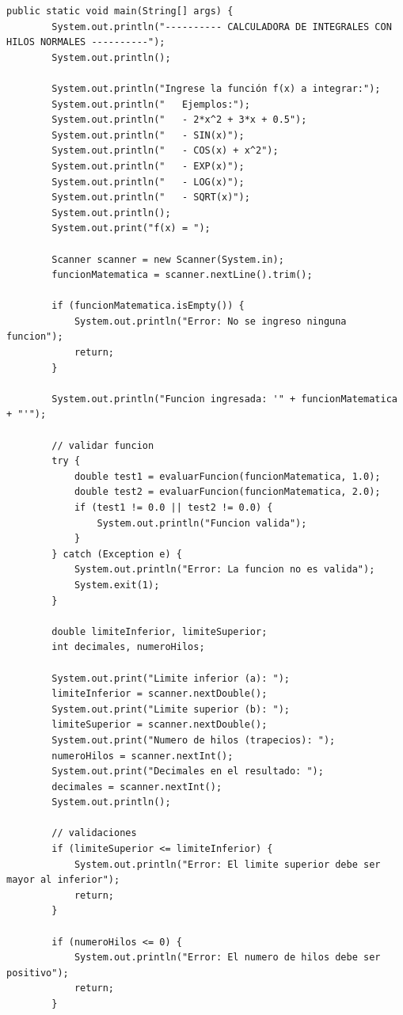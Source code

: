 \begin{lstlisting}[style=java-custom, caption={Función Main en Java}]
    public static void main(String[] args) {
        System.out.println("---------- CALCULADORA DE INTEGRALES CON HILOS NORMALES ----------");
        System.out.println();

        System.out.println("Ingrese la función f(x) a integrar:");
        System.out.println("   Ejemplos:");
        System.out.println("   - 2*x^2 + 3*x + 0.5");
        System.out.println("   - SIN(x)");
        System.out.println("   - COS(x) + x^2");
        System.out.println("   - EXP(x)");
        System.out.println("   - LOG(x)");
        System.out.println("   - SQRT(x)");
        System.out.println();
        System.out.print("f(x) = ");

        Scanner scanner = new Scanner(System.in);
        funcionMatematica = scanner.nextLine().trim();

        if (funcionMatematica.isEmpty()) {
            System.out.println("Error: No se ingreso ninguna funcion");
            return;
        }

        System.out.println("Funcion ingresada: '" + funcionMatematica + "'");

        // validar funcion
        try {
            double test1 = evaluarFuncion(funcionMatematica, 1.0);
            double test2 = evaluarFuncion(funcionMatematica, 2.0);
            if (test1 != 0.0 || test2 != 0.0) {
                System.out.println("Funcion valida");
            }
        } catch (Exception e) {
            System.out.println("Error: La funcion no es valida");
            System.exit(1);
        }

        double limiteInferior, limiteSuperior;
        int decimales, numeroHilos;

        System.out.print("Limite inferior (a): ");
        limiteInferior = scanner.nextDouble();
        System.out.print("Limite superior (b): ");
        limiteSuperior = scanner.nextDouble();
        System.out.print("Numero de hilos (trapecios): ");
        numeroHilos = scanner.nextInt();
        System.out.print("Decimales en el resultado: ");
        decimales = scanner.nextInt();
        System.out.println();

        // validaciones
        if (limiteSuperior <= limiteInferior) {
            System.out.println("Error: El limite superior debe ser mayor al inferior");
            return;
        }

        if (numeroHilos <= 0) {
            System.out.println("Error: El numero de hilos debe ser positivo");
            return;
        }


\end{lstlisting}
